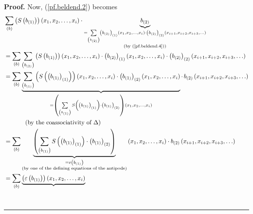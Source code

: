 \documentclass
[numbers=enddot,12pt,final,onecolumn,notitlepage,abstracton]{scrartcl}%
\theoremstyle{definition}
\newenvironment{proof}[1][Proof]{\noindent\textbf{#1.} }{\ \rule{0.5em}{0.5em}}
\newenvironment{noncompile}{}{}
\let\sumnonlimits\sum
\renewcommand{\sum}{\sumnonlimits\limits}
\begin{document}
\begin{noncompile}
\begin{proof}
Now, (\ref{pf.beldend.2}) becomes%
\begin{align*}
&  \sum_{\left(  b\right)  }\left(  S\left(  b_{\left(  1\right)  }\right)
\right)  \left(  x_{1},x_{2},\ldots,x_{i}\right)  \cdot\underbrace{b_{\left(
2\right)  }}_{\substack{=\sum_{\left(  b_{\left(  2\right)  }\right)  }\left(
b_{\left(  2\right)  }\right)  _{\left(  1\right)  }\left(  x_{1},x_{2}%
,\ldots,x_{i}\right)  \cdot\left(  b_{\left(  2\right)  }\right)  _{\left(
2\right)  }\left(  x_{i+1},x_{i+2},x_{i+3},\ldots\right)  \\\text{(by
(\ref{pf.beldend.4}))}}}\\
&  =\sum_{\left(  b\right)  }\sum_{\left(  b_{\left(  2\right)  }\right)
}\left(  S\left(  b_{\left(  1\right)  }\right)  \right)  \left(  x_{1}%
,x_{2},\ldots,x_{i}\right)  \cdot\left(  b_{\left(  2\right)  }\right)
_{\left(  1\right)  }\left(  x_{1},x_{2},\ldots,x_{i}\right)  \cdot\left(
b_{\left(  2\right)  }\right)  _{\left(  2\right)  }\left(  x_{i+1}%
,x_{i+2},x_{i+3},\ldots\right) \\
&  =\sum_{\left(  b\right)  }\underbrace{\sum_{\left(  b_{\left(  1\right)
}\right)  }\left(  S\left(  \left(  b_{\left(  1\right)  }\right)  _{\left(
1\right)  }\right)  \right)  \left(  x_{1},x_{2},\ldots,x_{i}\right)
\cdot\left(  b_{\left(  1\right)  }\right)  _{\left(  2\right)  }\left(
x_{1},x_{2},\ldots,x_{i}\right)  }_{=\left(  \sum_{\left(  b_{\left(
1\right)  }\right)  }S\left(  \left(  b_{\left(  1\right)  }\right)  _{\left(
1\right)  }\right)  \cdot\left(  b_{\left(  1\right)  }\right)  _{\left(
2\right)  }\right)  \left(  x_{1},x_{2},\ldots,x_{i}\right)  }\cdot
\,b_{\left(  2\right)  }\left(  x_{i+1},x_{i+2},x_{i+3},\ldots\right) \\
&  \ \ \ \ \ \ \ \ \ \ \left(  \text{by the coassociativity of }\Delta\right)
\\
&  =\sum_{\left(  b\right)  }\underbrace{\left(  \sum_{\left(  b_{\left(
1\right)  }\right)  }S\left(  \left(  b_{\left(  1\right)  }\right)  _{\left(
1\right)  }\right)  \cdot\left(  b_{\left(  1\right)  }\right)  _{\left(
2\right)  }\right)  }_{\substack{=\varepsilon\left(  b_{\left(  1\right)
}\right)  \\\text{(by one of the defining equations of the antipode)}}}\left(
x_{1},x_{2},\ldots,x_{i}\right)  \cdot b_{\left(  2\right)  }\left(
x_{i+1},x_{i+2},x_{i+3},\ldots\right) \\
&  =\sum_{\left(  b\right)  }\underbrace{\left(  \varepsilon\left(  b_{\left(
1\right)  }\right)  \right)  \left(  x_{1},x_{2},\ldots,x_{i}\right)
}
\end{align*}
\end{proof}
\end{noncompile}
\end{document}
